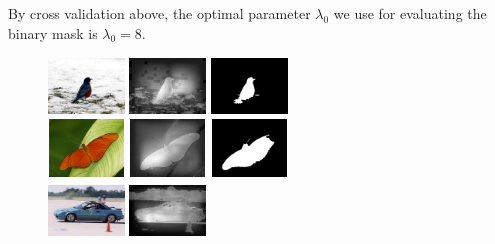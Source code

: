 \documentclass[10pt,twocolumn,letterpaper]{article}
\begin{document}
By cross validation above, the optimal parameter $\lambda_0$ we use for evaluating the binary mask is $\lambda_0 = 8$.

\begin{figure}
\begin{center}
    \includegraphics[width=0.8in,height=0.6in]{./Figures/CRFinference/5_159_159364.jpg}
    \includegraphics[width=0.8in,height=0.6in]{./Figures/CRFinference/5_159_159364_3.jpg}
    \includegraphics[width=0.8in,height=0.6in]{./Figures/CRFinference/5_159_159364_2.jpg} \\
    \includegraphics[width=0.8in,height=0.6in]{./Figures/CRFinference/5_159_159649.jpg}
    \includegraphics[width=0.8in,height=0.6in]{./Figures/CRFinference/5_159_159649_3.jpg}
    \includegraphics[width=0.8in,height=0.6in]{./Figures/CRFinference/5_159_159649_2.jpg} \\
    \includegraphics[width=0.8in,height=0.6in]{./Figures/CRFinference/5_162_162349.jpg}
    \includegraphics[width=0.8in,height=0.6in]{./Figures/CRFinference/5_162_162349_3.jpg}

\end{center}
\end{figure}
\end{document}

